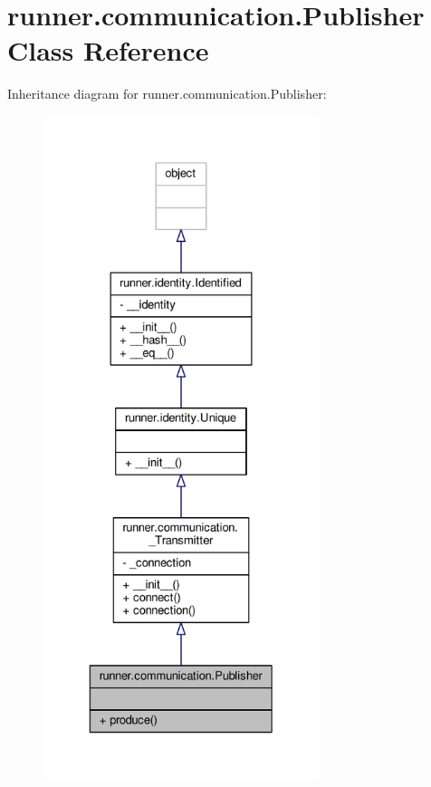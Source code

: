 \hypertarget{classrunner_1_1communication_1_1Publisher}{}\section{runner.\+communication.\+Publisher Class Reference}
\label{classrunner_1_1communication_1_1Publisher}


Inheritance diagram for runner.\+communication.\+Publisher\+:
\nopagebreak
\begin{figure}[H]
\begin{center}
\leavevmode
\includegraphics[height=550pt]{classrunner_1_1communication_1_1Publisher__inherit__graph}
\end{center}
\end{figure}


